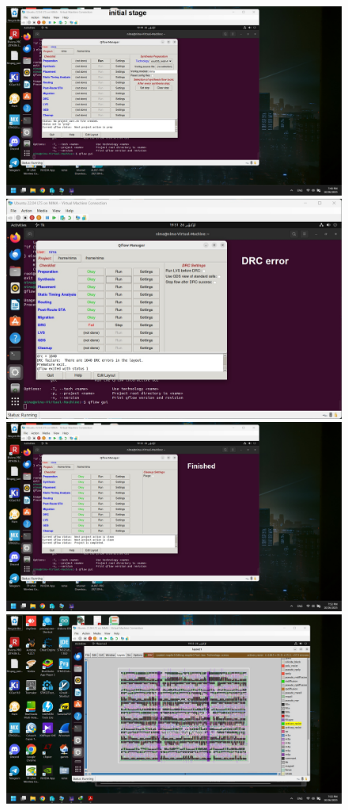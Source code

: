 \documentclass{exam}
\begin{document}
\begin{questions}
\begin{figure}[h]
\includegraphics[scale=0.2]{init.jpg}
\includegraphics[scale=0.2]{drc.jpg}
\includegraphics[scale=0.2]{finished.jpeg}
\includegraphics[scale=0.2]{layout.jpg}
\end{figure}



\end{questions}
\end{document}
